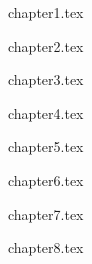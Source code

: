 \documentclass[11pt,twoside,a4paper]{report}
\begin{document}
\cleardoublepage
{}


{chapter1.tex}

{chapter2.tex}

{chapter3.tex}

{chapter4.tex}

{chapter5.tex}

{chapter6.tex}

{chapter7.tex}

{chapter8.tex}


\renewcommand{\bibname}{Lista de Referências}


\cleardoublepage
\end{document}
